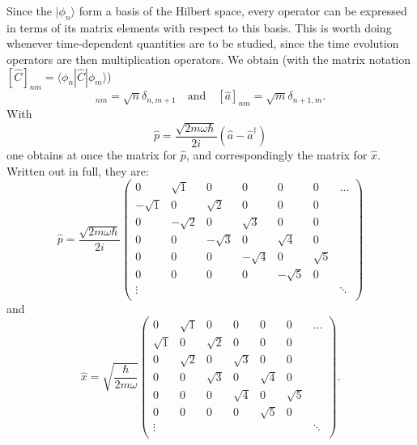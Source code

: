 Since the $|\phi_n\rangle$ form a basis of the Hilbert space, every operator can be expressed in terms of its matrix elements with respect to this basis. This is worth doing whenever time-dependent quantities are to be studied, since the time evolution operators are then multiplication operators. We obtain
(with the matrix notation $[\widehat{C}]_{nm} = \langle\phi_n|\widehat{C}|\phi_m\rangle$)
\begin{equation}
	[\widehat{a}^\dag]_{nm} = \sqrt{n}\delta_{n,m+1} \quad \text{and} \quad [\widehat{a}]_{nm} = \sqrt{m}\delta_{n+1,m}.
\end{equation}
With 
\begin{equation}
	\widehat{p} = \frac{\sqrt{2m\omega\hbar}}{2i}(\widehat{a}-\widehat{a}^\dag) 
\end{equation}
one obtains at once the matrix for $\widehat{p}$, and correspondingly the matrix for $\widehat{x}$. Written out in full, they are:
\begin{equation}
	\widehat{p} = \frac{\sqrt{2m\omega\hbar}}{2i}
	\begin{pmatrix}
		0 & \sqrt{1} & 0 & 0 & 0 & 0 & \hdots \\
		-\sqrt{1} & 0 & \sqrt{2} & 0 & 0 & 0 & \\
		0 & -\sqrt{2} & 0 & \sqrt{3} & 0 & 0 & \\
		0 & 0 & -\sqrt{3} & 0 & \sqrt{4} & 0 & \\
		0 & 0 & 0 & -\sqrt{4} & 0 & \sqrt{5} & \\
		0 & 0 & 0 & 0 & -\sqrt{5} & 0 & \\
		\vdots & & & & & & \ddots \\
	\end{pmatrix}
\end{equation}
and
\begin{equation}
	\widehat{x} = \sqrt{\frac{\hbar}{2m\omega}}
	\begin{pmatrix}
		0 & \sqrt{1} & 0 & 0 & 0 & 0 & \hdots \\
		\sqrt{1} & 0 & \sqrt{2} & 0 & 0 & 0 & \\
		0 & \sqrt{2} & 0 & \sqrt{3} & 0 & 0 & \\
		0 & 0 & \sqrt{3} & 0 & \sqrt{4} & 0 & \\
		0 & 0 & 0 & \sqrt{4} & 0 & \sqrt{5} & \\
		0 & 0 & 0 & 0 & \sqrt{5} & 0 & \\
		\vdots & & & & & & \ddots \\
	\end{pmatrix}.
\end{equation}


